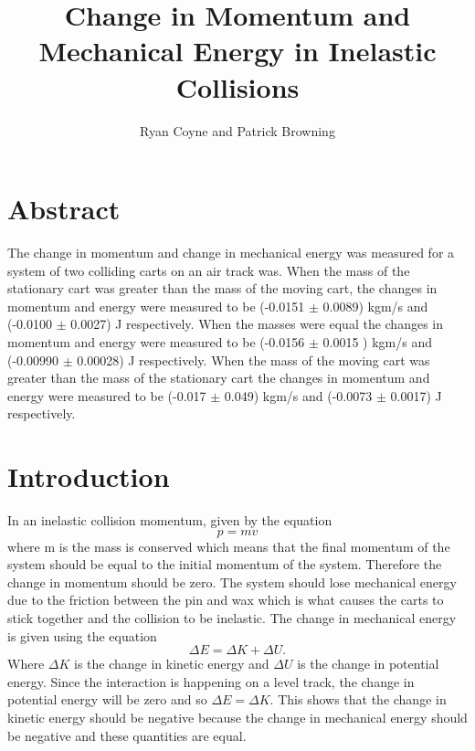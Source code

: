 \documentclass[12pt]{article}
\begin{document}
    \title{Change in Momentum and Mechanical Energy in Inelastic Collisions}
    \author{Ryan Coyne and Patrick Browning}
    \maketitle
    \section{Abstract}
        The change in momentum and change in mechanical energy was measured for a system of two colliding carts on an air track was. When the mass of the stationary cart was greater than the mass of the moving cart, the changes in momentum and energy were measured to be (-0.0151 \(\pm\) 0.0089) kgm/s and (-0.0100 \(\pm\) 0.0027) J respectively. When the masses were equal the changes in momentum and energy were measured to be (-0.0156 \(\pm\) 0.0015 ) kgm/s and (-0.00990 \(\pm\) 0.00028) J respectively. When the mass of the moving cart was greater than the mass of the stationary cart the changes in momentum and energy were measured to be (-0.017 \(\pm\) 0.049) kgm/s and (-0.0073 \(\pm\) 0.0017) J respectively.
    \section{Introduction}
        In an inelastic collision momentum, given by the equation
        \begin{equation*}
            p = mv
        \end{equation*}
        where m is the mass is conserved which means that the final momentum of the system should be equal to the initial momentum of the system. Therefore the change in momentum should be zero. The system should lose mechanical energy due to the friction between the pin and wax which is what causes the carts to stick together and the collision to be inelastic. The change in mechanical energy is given using the equation
        \begin{equation*}
            \Delta E = \Delta K + \Delta U.
        \end{equation*}
        Where \(\Delta K\) is the change in kinetic energy and \(\Delta U\) is the change in potential energy. Since the interaction is happening on a level track, the change in potential energy will be zero and so \(\Delta E = \Delta K\). This shows that the change in kinetic energy should be negative because the change in mechanical energy should be negative and these quantities are equal.
\end{document}
